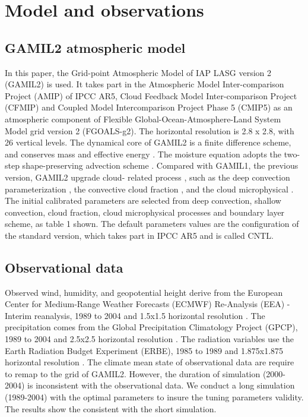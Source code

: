 \documentclass[gmd, manuscript]{copernicus}
\begin{document}
\section{Model and observations} 
\subsection{GAMIL2 atmospheric model} 
In this paper, the Grid-point Atmospheric Model of IAP LASG version 2 (GAMIL2) is used. It takes
part in the Atmospheric Model Inter-comparison Project (AMIP) of IPCC AR5, Cloud Feedback Model
Inter-comparison Project (CFMIP) and  Coupled Model Intercomparison Project Phase 5 (CMIP5) as an
atmospheric component of Flexible Global-Ocean-Atmosphere-Land System Model grid version 2
(FGOALS-g2). The horizontal resolution is 2.8 x 2.8, with 26 vertical levels. The dynamical core of
GAMIL2 is a finite difference scheme, and conserves mass and effective energy
\citep{wang2004design}. The moisture equation adopts the two- step shape-preserving advection
scheme \citep{rucong1994two}. Compared with GAMIL1, the previous version, GAMIL2 upgrade cloud-
related process \citep{li2013evaluation}, such as the deep convection parameterization
\citep{zhang2005effects}, the convective cloud fraction \citep{xu1991evaluation}, and the cloud
microphysical \citep{morrison2008new}. The initial calibrated parameters are selected  from deep
convection, shallow convection, cloud fraction, cloud microphysical processes and boundary layer
scheme, as table 1 shown. The default parameters values are the configuration of the standard
version, which takes part in IPCC AR5 and is called CNTL.


\subsection{Observational data}
Observed wind, humidity, and geopotential height derive from the European Center for Medium-Range
Weather Forecasts (ECMWF) Re-Analysis (EEA) - Interim reanalysis, 1989 to 2004 and 1.5x1.5
horizontal resolution \citep{simmons2007era}. The precipitation comes from the Global Precipitation
Climatology Project (GPCP), 1989 to 2004 and 2.5x2.5 horizontal resolution \citep{adler2003version}
. The radiation variables use the Earth Radiation Budget Experiment (ERBE), 1985 to 1989  and
1.875x1.875 horizontal resolution \citep{barkstrom1984earth}. The climate mean state of
observational data are require to  remap to the grid of GAMIL2. However, the duration of simulation
(2000-2004)  is inconsistent with the observational data. We conduct a long simulation (1989-2004)
with the optimal parameters to insure the tuning parameters validity. The results show the
consistent with the short simulation.
\end{document}
